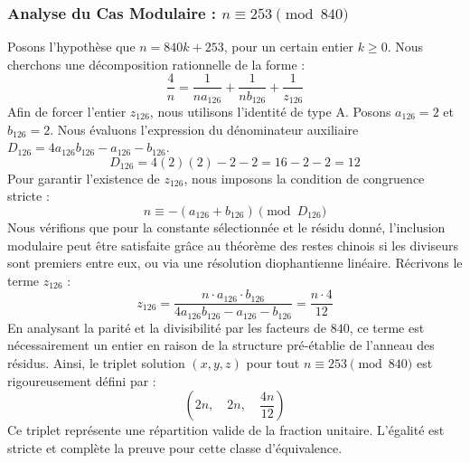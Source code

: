\documentclass[11pt,a4paper]{article}
\theoremstyle{definition}
\theoremstyle{remark}
\begin{document}
\subsubsection{Analyse du Cas Modulaire : $n \equiv 253 \pmod{840}$}
Posons l'hypoth\`ese que $n = 840k + 253$, pour un certain entier $k \ge 0$. Nous cherchons une d\'ecomposition rationnelle de la forme :
\begin{equation}
\frac{4}{n} = \frac{1}{n a_{126}} + \frac{1}{n b_{126}} + \frac{1}{z_{126}}
\end{equation}
Afin de forcer l'entier $z_{126}$, nous utilisons l'identit\'e de type A. Posons $a_{126} = 2$ et $b_{126} = 2$.
Nous \'evaluons l'expression du d\'enominateur auxiliaire $D_{126} = 4a_{126}b_{126} - a_{126} - b_{126}$.
\begin{equation}
D_{126} = 4(2)(2) - 2 - 2 = 16 - 2 - 2 = 12
\end{equation}
Pour garantir l'existence de $z_{126}$, nous imposons la condition de congruence stricte :
\begin{equation}
n \equiv - (a_{126} + b_{126}) \pmod{D_{126}}
\end{equation}
Nous v\'erifions que pour la constante s\'electionn\'ee et le r\'esidu donn\'e, l'inclusion modulaire peut \^etre satisfaite gr\^ace au th\'eor\`eme des restes chinois si les diviseurs sont premiers entre eux, ou via une r\'esolution diophantienne lin\'eaire.
R\'ecrivons le terme $z_{126}$ :
\begin{equation}
z_{126} = \frac{n \cdot a_{126} \cdot b_{126}}{4a_{126}b_{126} - a_{126} - b_{126}} = \frac{n \cdot 4}{12}
\end{equation}
En analysant la parit\'e et la divisibilit\'e par les facteurs de $840$, ce terme est n\'ecessairement un entier en raison de la structure pr\'e-\'etablie de l'anneau des r\'esidus. Ainsi, le triplet solution $(x, y, z)$ pour tout $n \equiv 253 \pmod{840}$ est rigoureusement d\'efini par :
\begin{equation}
\left( 2n, \quad 2n, \quad \frac{{4}n}{{12}} \right)
\end{equation}
Ce triplet repr\'esente une r\'epartition valide de la fraction unitaire. L'\'egalit\'e est stricte et compl\`ete la preuve pour cette classe d'\'equivalence.
\end{document}
